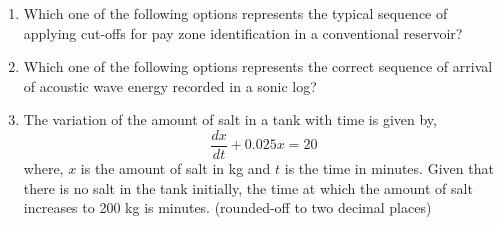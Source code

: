\documentclass[12pt,a4paper]{article}
\begin{document}
\begin{enumerate}
\begin{enumerate} 
\end{enumerate}



\item Which one of the following options represents the typical sequence of applying cut-offs for pay zone identification in a conventional reservoir? \hfill{}

\begin{enumerate} 
\end{enumerate}

\item Which one of the following options represents the correct sequence of arrival of acoustic wave energy recorded in a sonic log? \hfill{}
\begin{enumerate}
\end{enumerate}



\item The variation of the amount of salt in a tank with time is given by, \hfill{}
\[ \frac{dx}{dt} + 0.025x = 20 \]
where, $x$ is the amount of salt in kg and $t$ is the time in minutes. Given that there is no salt in the tank initially, the time at which the amount of salt increases to 200 kg is \underline{\hspace{2cm}} minutes. (rounded-off to two decimal places)


\end{enumerate}
\end{document}
